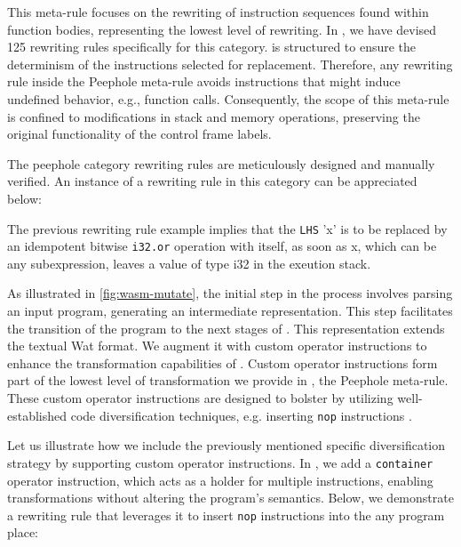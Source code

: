 This meta-rule  focuses on the rewriting of instruction sequences found within function bodies, representing the lowest level of rewriting. 
In \tool, we have devised 125 rewriting rules specifically for this category.
\tool is structured to ensure the determinism of the instructions selected for replacement.
Therefore, any rewriting rule inside the Peephole meta-rule avoids instructions that might induce undefined behavior, e.g., function calls.
Consequently, the scope of this meta-rule is confined to modifications in stack and memory operations, preserving the original functionality of the control frame labels.

The peephole category rewriting rules are meticulously designed and manually verified. 
An instance of a rewriting rule in this category can be appreciated below:



The previous rewriting rule example implies that the \texttt{LHS} 'x' is to be replaced by an idempotent bitwise \texttt{i32.or} operation with itself,  as soon as x, which can be any subexpression, leaves a value of type i32 in the exeution stack.

\label{custom}

As illustrated in \autoref{fig:wasm-mutate}, the initial step in the process involves parsing an input \Wasm program, generating an intermediate representation. 
This step facilitates the transition of the \Wasm program to the next stages of \tool. 
This representation extends the textual Wat format.
We augment it with custom operator instructions to enhance the transformation capabilities of \tool \cite{webassembly_runtime}.
Custom operator instructions form part of the lowest level of transformation we provide in \tool, the Peephole meta-rule.
These custom operator instructions are designed to bolster \tool by utilizing well-established code diversification techniques, e.g. inserting \texttt{nop} instructions \cite{NOP}.


Let us illustrate how we include the previously mentioned specific diversification strategy by supporting custom operator instructions.
In \tool, we add a \texttt{container} operator instruction, which acts as a holder for multiple instructions, enabling transformations without altering the program's semantics. 
Below, we demonstrate a rewriting rule that leverages it to insert \texttt{nop} instructions into the any \Wasm program place:

